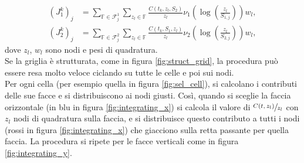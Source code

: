 \documentclass[a4paper,10pt]{report}
\theoremstyle{plain}
\theoremstyle{definition}
\theoremstyle{remark}
\begin{document}
\begin{align*}
 (J_1^{k})_j&=\sum\limits_{\mathbb{F}\in \mathcal{F}^1_j} \sum\limits_{z_l \in \mathbb{F}}\frac{C(t_k,z_l,S_2)}{z_l}\nu_1\left(\log\left(\frac{z_l}{S_{1,j}}\right)\right)w_l,\\
 (J_2^{k})_j&=\sum\limits_{\mathbb{F}\in \mathcal{F}^2_j} \sum\limits_{z_l \in \mathbb{F}}\frac{C(t_k,S_1,z_l)}{z_l}\nu_2\left(\log\left(\frac{z_l}{S_{2,j}}\right)\right)w_l,
\end{align*}
dove $z_l$, $w_l$ sono nodi e pesi di quadratura.\\

Se la griglia è strutturata, come in figura \ref{fig:struct_grid}, la procedura può essere resa molto veloce ciclando su tutte le celle e poi sui nodi.\\
Per ogni cella (per esempio quella in figura \ref{fig:sel_cell}), si calcolano i contributi delle sue facce e si distribuiscono ai nodi giusti. Cos\`i, quando si sceglie la faccia orizzontale (in blu in figura \ref{fig:integrating_x}) si calcola il valore di $\sfrac{C(t,z_l)}{z_l}$ con $z_l$ nodi di quadratura sulla faccia, e si distribuisce questo contributo a tutti i nodi (rossi in figura \ref{fig:integrating_x}) che giacciono sulla retta passante per quella faccia. La procedura si ripete per le facce verticali come in figura \ref{fig:integrating_y}.
\end{document}
